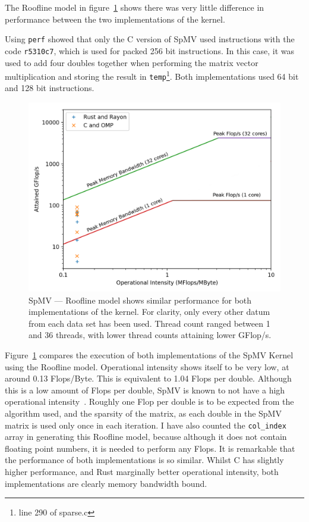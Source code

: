 The Roofline model in figure~\ref{fig:roofline} shows there was very little difference in performance between the two implementations of the kernel.

Using \texttt{perf} showed that only the C version of SpMV used instructions with the code \texttt{r5310c7}, which is used for packed 256 bit instructions. In this case, it was used to add four doubles together when performing the matrix vector multiplication and storing the result in \texttt{temp}\footnote{line 290 of sparse.c}. Both implementations used 64 bit and 128 bit instructions. 

\begin{figure}[h]
\centering
\includegraphics[width=.9\linewidth]{figs/sparse/roofline.png}
\caption[SpMV --- Roofline model]{SpMV --- Roofline model shows similar performance for both implementations of the kernel. For clarity, only every other datum from each data set has been used. Thread count ranged between 1 and 36 threads, with lower thread counts attaining lower GFlop/s.}\label{fig:roofline}
\end{figure}

Figure~\ref{fig:roofline} compares the execution of both implementations of the SpMV Kernel using the Roofline model. Operational intensity shows itself to be very low, at around 0.13 Flops/Byte. This is equivalent to 1.04 Flops per double.
Although this is a low amount of Flops per double, SpMV is known to not have a high operational intensity~\cite{SparseArith}. Roughly one Flop per double is to be expected from the algorithm used, and the sparsity of the matrix, as each double in the SpMV matrix is used only once in each iteration. I have also counted the \texttt{col\_index} array in generating this Roofline model, because although it does not contain floating point numbers, it is needed to perform any Flops.
It is remarkable that the performance of both implementations is so similar. Whilst C has slightly higher performance, and Rust marginally better operational intensity, both implementations are clearly memory bandwidth bound. 

